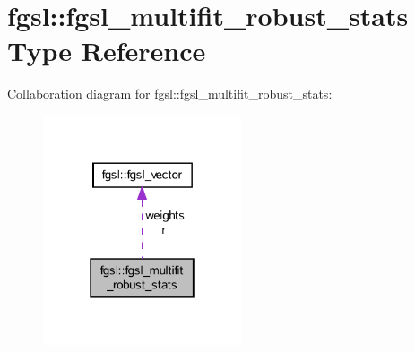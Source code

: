 \hypertarget{structfgsl_1_1fgsl__multifit__robust__stats}{}\section{fgsl\+:\+:fgsl\+\_\+multifit\+\_\+robust\+\_\+stats Type Reference}
\label{structfgsl_1_1fgsl__multifit__robust__stats}


Collaboration diagram for fgsl\+:\+:fgsl\+\_\+multifit\+\_\+robust\+\_\+stats\+:\nopagebreak
\begin{figure}[H]
\begin{center}
\leavevmode
\includegraphics[width=166pt]{structfgsl_1_1fgsl__multifit__robust__stats__coll__graph}
\end{center}
\end{figure}
